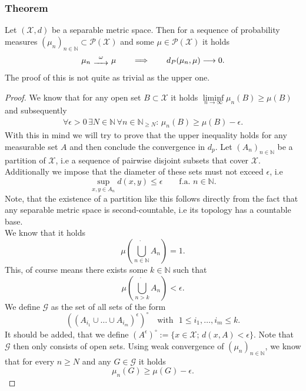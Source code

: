 \documentclass[11pt,a4paper]{article}
\begin{document}
\subsubsection{Theorem}
Let $(\mathcal{X},d)$ be a separable metric space. Then for a sequence of probability measures $(\mu_n)_{n\in\mathbb{N}}\subset\mathcal{P(X)}$ and some $\mu\in\mathcal{P(X)}$ it holds 
\[
\mu_n\,\,\substack{\omega \\ \xrightarrow{\hspace{1.2em}}}\,\,\mu \quad\quad\Longrightarrow\quad\quad d_P(\mu_n,\mu)\longrightarrow{}0.
\]
The proof of this is not quite as trivial as the upper one.
\begin{proof}
We know that for any open set $B\subset\mathcal{X}$ it holds $\liminf\limits_{n\rightarrow\infty}\mu_n(B)\geq\mu(B)$ and subsequently
\begin{align*}
\forall\epsilon>0\,\exists{}N\in\mathbb{N}\,\forall{}n\in\mathbb{N}_{\geq{}N}:\,\mu_n(B)\geq\mu(B)-\epsilon.
\end{align*}
With this in mind we will try to prove that the upper inequality holds for any measurable set $A$ and then conclude the convergence in $d_p$.
Let $(A_n)_{n\in\mathbb{N}}$ be a partition of $\mathcal{X}$, i.e a sequence of pairwise disjoint subsets that cover $\mathcal{X}$. \vspace{1em}\\Additionally we impose that the diameter of these sets must not exceed $\epsilon$, i.e \[\sup\limits_{x,y\in{}A_n}d(x,y)\leq\epsilon\quad\quad\text{f.a. }n\in\mathbb{N}.\] Note, that the existence of a partition like this follows directly from the fact that any separable metric space is second-countable, i.e its topology has a countable base.\vspace{1em}\\
We know that it holds
\[
\mu\left(\dot{\bigcup\limits_{n\in\mathbb{N}}}A_n\right)=1.
\]
This, of course means there exists some $k\in\mathbb{N}$ such that 
\[
\mu\left(\dot{\bigcup\limits_{n>k}}A_n\right)<\epsilon.
\]
We define $\mathcal{G}$ as the set of all sets of the form
\[
\left(\left(A_{i_1}\cup\ldots\cup{}A_{i_m}\right)^{\epsilon}\right)^{\circ}\quad\text{with}\,\,\,\,1\leq{}i_1,\ldots{},i_m\leq{}k.
\]
It should be added, that we define $\left(A^{\epsilon}\right)^{\circ}:=\lbrace{}x\in\mathcal{X};\,d(x,A)<\epsilon\rbrace$. Note that $\mathcal{G}$ then only consists of open sets. Using weak convergence of $(\mu_n)_{n\in\mathbb{N}}$, we know that for every $n\geq{}N$ and any $G\in\mathcal{G}$ it holds 
\[
\mu_n(G)\geq\mu(G)-\epsilon.
\]
\end{proof}
\end{document}
